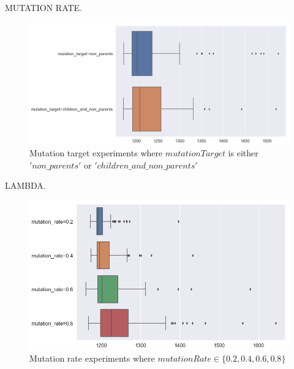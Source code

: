 \documentclass[11pt]{article}
\begin{document}
MUTATION RATE.

\begin{figure}[h]
  \includegraphics[scale=0.4]{mutation_target}
  \centering
  \caption{Mutation target experiments where $mutationTarget$ is either $'non\_parents'$ or $'children\_and\_non\_parents'$}
  \label{fig:mutation_target}
  \end{figure}

LAMBDA.

\begin{figure}[h]
  \includegraphics[scale=0.5]{mutation_rate}
  \centering
  \caption{Mutation rate experiments where $mutationRate \in \{0.2, 0.4, 0.6, 0.8\}$}
  \label{fig:mutation_rate}
  \end{figure}
\end{document}

